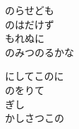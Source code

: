 \documentclass[10pt,b5j]{tarticle} %
\begin{document}
\begin{enumerate}
\begin{minipage}[c]{\blocksize}
        \vspace{\linespace}
        \item
        のらせども\\
        のはだけず\\
        もれぬに\\
        のみつのるかな
        
        \vspace{\linespace}
        \item
        にしてこのに\\
        のをりて\\
        ぎし\\
        かしさつこの
    
    \end{minipage}
\end{enumerate} %
\end{document}
